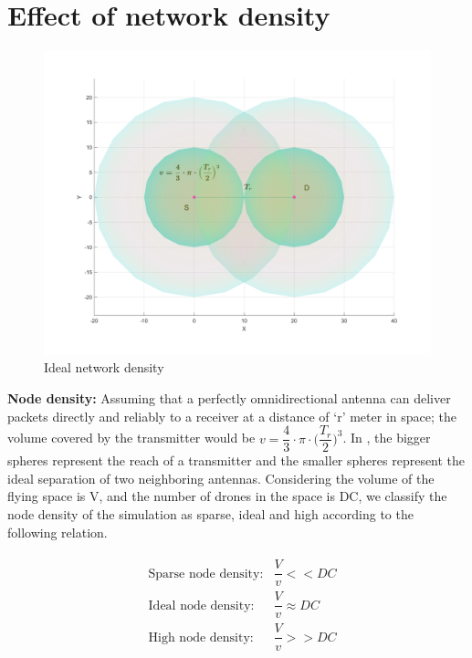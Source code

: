 \section{Effect of network density}

\begin{figure}[hbtp]
\centering
\includegraphics[width=1\textwidth]{ncsuthesis-0.6/Chapter-5/figs/nodeDensity}
\caption{Ideal network density}
\label{fig:node_density}
\end{figure}

\textbf{Node density:} Assuming that a perfectly omnidirectional antenna can deliver packets directly and reliably to a receiver at a distance of `r' meter  in space; the volume covered by the transmitter would be $ v = \dfrac{4}{3} \cdot \pi \cdot \Big( \dfrac{T_r}{2}\big)^3 $. In , the bigger spheres represent the reach of a transmitter and the smaller spheres represent the ideal separation of two neighboring antennas. Considering the volume of the flying space is V, and the number of drones in the space is DC, we classify the node density of the simulation as sparse, ideal and high according to the following relation.

\begin{eqnarray} \label{node_density}
\begin{aligned}
& \text{Sparse node density:} & \dfrac{V}{v} << DC \\
& \text{Ideal node density:} & \dfrac{V}{v} \approx DC \\
& \text{High node density:} & \dfrac{V}{v} >> DC
\end{aligned}
\end{eqnarray}

